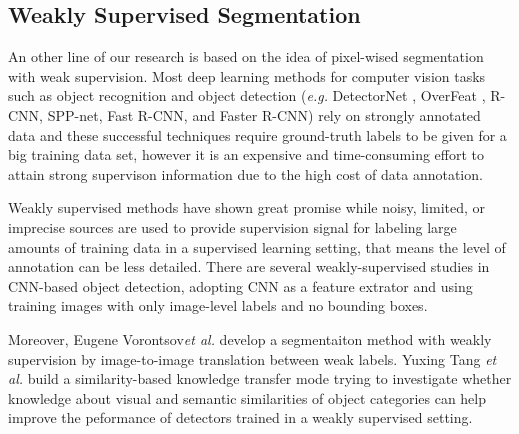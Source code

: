 \documentclass[10pt,twocolumn,letterpaper]{article}
\begin{document}
\subsection{Weakly Supervised Segmentation}
An other line of our research is based on the idea of pixel-wised segmentation with weak supervision.
Most deep learning methods for computer vision tasks such as object recognition\cite{simonyan2014very,russakovsky2015imagenet} and object detection (\textit{e.g.} DetectorNet \cite{szegedy2013deep}, OverFeat \cite{sermanet2013overfeat}, R-CNN\cite{girshick2014rich}, SPP-net\cite{he2015spatial}, Fast R-CNN\cite{girshick2015fast}, and Faster R-CNN\cite{ren2015faster}) rely on strongly annotated data and these successful techniques require ground-truth labels to be given for a big training data set, 
however it is an expensive and time-consuming effort to attain strong supervison information due to the high cost of data annotation.

Weakly supervised methods\cite{bilen2016weakly}\cite{peyre2017weakly}\cite{arandjelovic2016netvlad} have shown great promise while noisy, limited, or imprecise sources are used to provide supervision signal for labeling large amounts of training data in a supervised learning setting, that means the level of annotation can be less detailed. 
There are several weakly-supervised studies\cite{bilen2014weakly}\cite{bilen2015weakly}\cite{song2014learning} in CNN-based object detection, adopting CNN as a feature extrator and using training images with only image-level labels and no bounding boxes.

Moreover, Eugene Vorontsov\textit{et al.} \cite{vorontsov2019boosting} develop a segmentaiton method with weakly supervision by image-to-image translation between weak labels.
Yuxing Tang \textit{et al.}\cite{tang2016large} build a similarity-based knowledge transfer mode trying to investigate whether knowledge about visual and semantic similarities of object categories can help improve the peformance of detectors trained in a weakly supervised setting.
\end{document}
